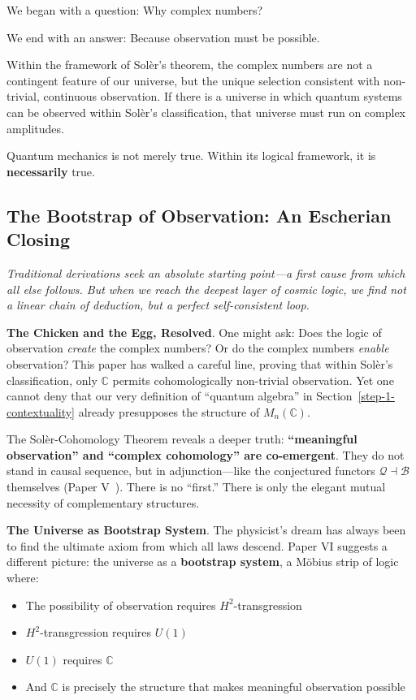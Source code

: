 \documentclass[11pt]{article}
\begin{document}
We began with a question: Why complex numbers?

We end with an answer: Because observation must be possible.

Within the framework of Sol\`{e}r's theorem, the complex numbers are not a contingent feature of our universe, but the unique selection consistent with non-trivial, continuous observation. If there is a universe in which quantum systems can be observed within Sol\`{e}r's classification, that universe must run on complex amplitudes.

Quantum mechanics is not merely true. Within its logical framework, it is \textbf{necessarily} true.

\subsection{The Bootstrap of Observation: An Escherian Closing}
\label{bootstrap-of-observation}

\textit{Traditional derivations seek an absolute starting point---a first cause from which all else follows. But when we reach the deepest layer of cosmic logic, we find not a linear chain of deduction, but a perfect self-consistent loop.}

\textbf{The Chicken and the Egg, Resolved}.
One might ask: Does the logic of observation \textit{create} the complex numbers? Or do the complex numbers \textit{enable} observation? This paper has walked a careful line, proving that within Sol\`{e}r's classification, only $\mathbb{C}$ permits cohomologically non-trivial observation. Yet one cannot deny that our very definition of ``quantum algebra'' in Section~\ref{step-1-contextuality} already presupposes the structure of $M_n(\mathbb{C})$.

The Sol\`{e}r-Cohomology Theorem reveals a deeper truth: \textbf{``meaningful observation'' and ``complex cohomology'' are co-emergent}. They do not stand in causal sequence, but in adjunction---like the conjectured functors $\mathcal{Q} \dashv \mathcal{B}$ themselves (Paper V~\cite{PaperV}). There is no ``first.'' There is only the elegant mutual necessity of complementary structures.

\textbf{The Universe as Bootstrap System}.
The physicist's dream has always been to find the ultimate axiom from which all laws descend. Paper VI suggests a different picture: the universe as a \textbf{bootstrap system}, a M\"{o}bius strip of logic where:
\begin{itemize}
\item The possibility of observation requires $H^2$-transgression
\item $H^2$-transgression requires $U(1)$
\item $U(1)$ requires $\mathbb{C}$
\item And $\mathbb{C}$ is precisely the structure that makes meaningful observation possible
\end{itemize}
\end{document}
